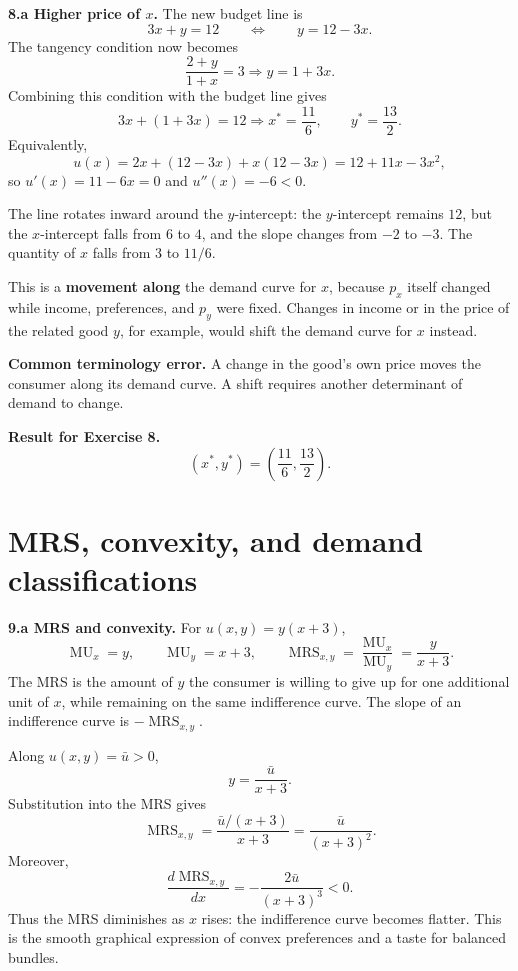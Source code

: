 \documentclass[11pt,a4paper]{article}
\newcommand{\MRS}{\operatorname{MRS}}
\newcommand{\MU}{\operatorname{MU}}
\begin{document}
\textbf{8.a Higher price of \(x\).} The new budget line is
\[
  3x+y=12
  \qquad\Longleftrightarrow\qquad
  y=12-3x.
\]
The tangency condition now becomes
\[
  \frac{2+y}{1+x}=3
  \Longrightarrow y=1+3x.
\]
Combining this condition with the budget line gives
\[
  3x+(1+3x)=12
  \Longrightarrow
  x^*=\frac{11}{6},
  \qquad
  y^*=\frac{13}{2}.
\]
Equivalently,
\[
  u(x)=2x+(12-3x)+x(12-3x)=12+11x-3x^2,
\]
so \(u'(x)=11-6x=0\) and \(u''(x)=-6<0\).

The line rotates inward around the \(y\)-intercept: the \(y\)-intercept
remains \(12\), but the \(x\)-intercept falls from \(6\) to \(4\), and the
slope changes from \(-2\) to \(-3\). The quantity of \(x\) falls from \(3\)
to \(11/6\).

This is a \textbf{movement along} the demand curve for \(x\), because
\(p_x\) itself changed while income, preferences, and \(p_y\) were fixed.
Changes in income or in the price of the related good \(y\), for example,
would shift the demand curve for \(x\) instead.

\begin{tipbox}
\textbf{Common terminology error.} A change in the good's own price moves
the consumer along its demand curve. A shift requires another determinant of
demand to change.
\end{tipbox}

\begin{solutionbox}
\textbf{Result for Exercise 8.}
\[
  \boxed{(x^*,y^*)=\left(\frac{11}{6},\frac{13}{2}\right).}
\]
\end{solutionbox}

\section{MRS, convexity, and demand classifications}

\textbf{9.a MRS and convexity.} For \(u(x,y)=y(x+3)\),
\[
  \MU_x=y,
  \qquad
  \MU_y=x+3,
  \qquad
  \MRS_{x,y}=\frac{\MU_x}{\MU_y}=\frac{y}{x+3}.
\]
The MRS is the amount of \(y\) the consumer is willing to give up for one
additional unit of \(x\), while remaining on the same indifference curve.
The slope of an indifference curve is \(-\MRS_{x,y}\).

Along \(u(x,y)=\bar u>0\),
\[
  y=\frac{\bar u}{x+3}.
\]
Substitution into the MRS gives
\[
  \MRS_{x,y}
  =\frac{\bar u/(x+3)}{x+3}
  =\boxed{\frac{\bar u}{(x+3)^2}}.
\]
Moreover,
\[
  \frac{d\MRS_{x,y}}{dx}
  =-\frac{2\bar u}{(x+3)^3}<0.
\]
Thus the MRS diminishes as \(x\) rises: the indifference curve becomes
flatter. This is the smooth graphical expression of convex preferences and
a taste for balanced bundles.
\end{document}
